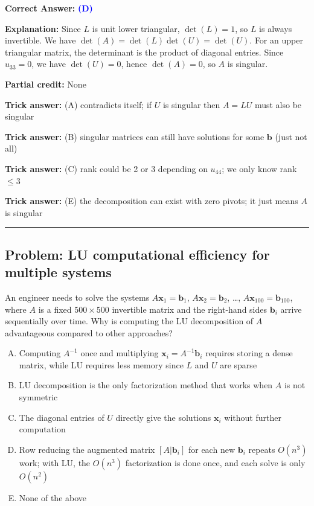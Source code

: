 \documentclass[12pt]{amsart}
\newcommand{\divider}{
  \vspace{-1em}
  \noindent
  \raisebox{-0.15ex}{\textbullet}%
  \hspace{0.5em}%
  \rule[0.5ex]{0.95\textwidth}{1.0pt}%
  \hspace{0.5em}%
  \raisebox{-0.15ex}{\textbullet}%
  \vspace{0em}
}
\begin{document}
\textbf{Correct Answer:} \textcolor{blue}{\textbf{(D)}}

\textbf{Explanation:} Since $L$ is unit lower triangular, $\det(L) = 1$, so $L$ is always invertible. We have $\det(A) = \det(L)\det(U) = \det(U)$. For an upper triangular matrix, the determinant is the product of diagonal entries. Since $u_{33} = 0$, we have $\det(U) = 0$, hence $\det(A) = 0$, so $A$ is singular.

\textbf{Partial credit:} None

\textbf{Trick answer:} (A) contradicts itself; if $U$ is singular then $A = LU$ must also be singular

\textbf{Trick answer:} (B) singular matrices can still have solutions for some $\mathbf{b}$ (just not all)

\textbf{Trick answer:} (C) rank could be 2 or 3 depending on $u_{44}$; we only know rank $\leq 3$

\textbf{Trick answer:} (E) the decomposition can exist with zero pivots; it just means $A$ is singular

\divider

\subsection*{Problem: LU computational efficiency for multiple systems}

An engineer needs to solve the systems $A\mathbf{x}_1 = \mathbf{b}_1$, $A\mathbf{x}_2 = \mathbf{b}_2$, \ldots, $A\mathbf{x}_{100} = \mathbf{b}_{100}$, where $A$ is a fixed $500 \times 500$ invertible matrix and the right-hand sides $\mathbf{b}_i$ arrive sequentially over time. Why is computing the LU decomposition of $A$ advantageous compared to other approaches?

\begin{enumerate}[(A)]
\item Computing $A^{-1}$ once and multiplying $\mathbf{x}_i = A^{-1}\mathbf{b}_i$ requires storing a dense matrix, while LU requires less memory since $L$ and $U$ are sparse
\item LU decomposition is the only factorization method that works when $A$ is not symmetric
\item The diagonal entries of $U$ directly give the solutions $\mathbf{x}_i$ without further computation
\item Row reducing the augmented matrix $[A | \mathbf{b}_i]$ for each new $\mathbf{b}_i$ repeats $O(n^3)$ work; with LU, the $O(n^3)$ factorization is done once, and each solve is only $O(n^2)$
\item None of the above
\end{enumerate}
\end{document}
